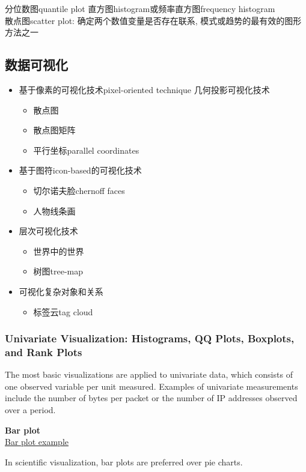 \documentclass{article}
\begin{document}
分位数图quantile plot
直方图histogram或频率直方图frequency histogram\\
散点图scatter plot: 确定两个数值变量是否存在联系, 模式或趋势的最有效的图形方法之一\\

\subsection{数据可视化}
\begin{itemize}
\item 基于像素的可视化技术pixel-oriented technique
几何投影可视化技术
	\begin{itemize}
	\item 散点图
	\item 散点图矩阵
    \item 平行坐标parallel coordinates
	\end{itemize}
\item 基于图符icon-based的可视化技术
	\begin{itemize}
	\item 切尔诺夫脸chernoff faces
	\item 人物线条画
	\end{itemize}
\item 层次可视化技术
	\begin{itemize}
	\item 世界中的世界
	\item 树图tree-map
	\end{itemize}
\item 可视化复杂对象和关系
	\begin{itemize}
	\item 标签云tag cloud
	\end{itemize}
\end{itemize}

\subsubsection{Univariate Visualization: Histograms, QQ Plots, Boxplots, and Rank Plots}
The most basic visualizations are applied to univariate data, which consists of one observed variable per unit measured. 
Examples of univariate measurements include the number of
bytes per packet or the number of IP addresses observed over a period.

\textbf{Bar plot}\\
\href{https://www.idlcoyote.com/cg\_tips/barplot\_2.png}{Bar plot example}

In scientific visualization, bar plots are preferred over pie charts.
\end{document}
